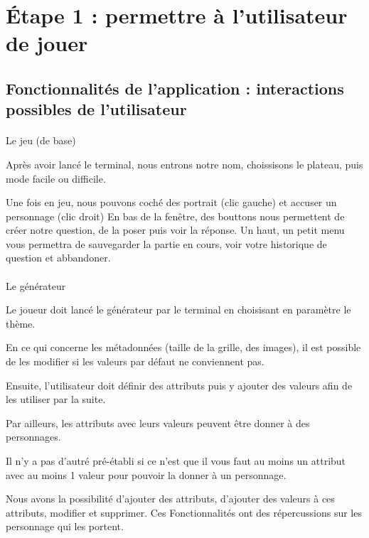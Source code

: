 \documentclass[a4paper]{article}
\begin{document}
 \clearpage
 \section{Étape 1 : permettre à l'utilisateur de jouer}

 \subsection*{Fonctionnalités de l'application : interactions possibles de l'utilisateur}
 
 \paragraph*{}
 Le jeu (de base)
 
 Après avoir lancé le terminal, nous entrons notre nom, choissisons le plateau, puis mode facile ou difficile.
 
 Une fois en jeu, nous pouvons coché des portrait (clic gauche) et accuser un personnage (clic droit)
 En bas de la fenêtre, des bouttons nous permettent de créer notre question, de la poser puis voir la réponse.
 Un haut, un petit menu vous permettra de sauvegarder la partie en cours, voir votre historique de question et abbandoner.
 
 \paragraph*{}
 Le générateur
 
 Le joueur doit lancé le générateur par le terminal en choisisant en paramètre le thème.
 
 En ce qui concerne les métadonnées (taille de la grille, des images), il est possible de les modifier si les valeurs par défaut ne conviennent pas.
 
 Ensuite, l'utilisateur doit définir des attributs puis y ajouter des valeurs afin de les utiliser par la suite.
 
 Par ailleurs, les attributs avec leurs valeurs peuvent être donner à des personnages.
 
 Il n'y a pas d'autré pré-établi si ce n'est que il vous faut au moins un attribut avec au moins 1 valeur pour pouvoir la donner à un personnage. 
 
 Nous avons la possibilité d'ajouter des attributs, d'ajouter des valeurs à ces attributs, modifier et supprimer. Ces Fonctionnalités ont des répercussions sur les personnage qui les portent.
 
 
\end{document}
